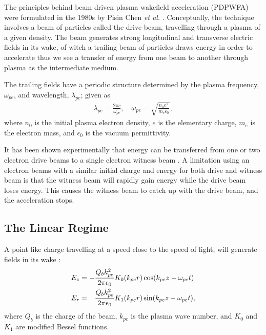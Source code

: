 The principles behind beam driven plasma wakefield acceleration (PDPWFA) were formulated in the 1980s by Pisin Chen \emph{et al.} \cite{chen:1985}. Conceptually, the technique involves a beam of particles called the drive beam, travelling through a plasma of a given density. The beam generates strong longitudinal and transverse electric fields in its wake, of witch a trailing beam of particles draws energy in order to accelerate \dash thus we see a transfer of energy from one beam to another through plasma as the intermediate medium.

The trailing fields have a periodic structure determined by the plasma frequency, $\omega_{pe}$, and wavelength, $\lambda_{pe}$; given as
\begin{align}
    \lambda_{pe} = \frac{2\pi c}{\omega_{pe}}, \quad \omega_{pe} = \sqrt{\frac{n_{0}e^{2}}{m_{e}\epsilon_{0}}}, \label{EQ:PWFA:L0W0}
\end{align}
where $n_{0}$ is the initial plasma electron density, $e$ is the elementary charge, $m_{e}$ is the electron mass, and $\epsilon_{0}$ is the vacuum permittivity.

It has been shown experimentally that energy can be transferred from one or two electron drive beams to a single electron witness beam \cite{rosenzweig:1988, blumenfeld:2007, kallos:2008, litos:2014}. A limitation using an electron beams with a similar initial charge and energy for both drive and witness beam is that the witness beam will rapidly gain energy while the drive beam loses energy. This causes the witness beam to catch up with the drive beam, and the acceleration stops. 

\subsection{The Linear Regime}
\label{Int:PWFA:Lin}

A point like charge travelling at a speed close to the speed of light, will generate fields in its wake \cite{van_der_meer:1985,chen:1985}:
\begin{align}
    E_{z} &= -\frac{Q_{b}k_{pe}^{2}}{2\pi\epsilon_{0}} K_{0}(k_{pe}r)\cos(k_{pe}z - \omega_{pe}t) \label{EQ:PWFA:EZ} \\
    E_{r} &= \hphantom{-} \frac{Q_{b}k_{pe}^{2}}{2\pi\epsilon_{0}} K_{1}(k_{pe}r)\sin(k_{pe}z - \omega_{pe}t), \label{EQ:PWFA:ER}
\end{align}
where $Q_{b}$ is the charge of the beam, $k_{pe}$ is the plasma wave number, and $K_{0}$ and $K_{1}$ are modified Bessel functions. 

